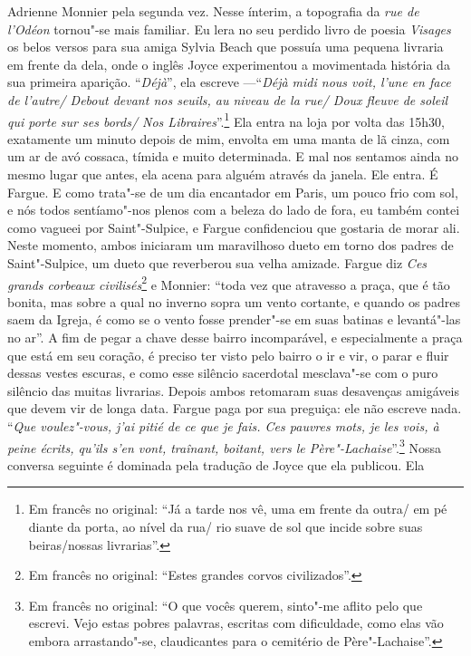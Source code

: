 Adrienne Monnier pela segunda vez. Nesse ínterim,
a topografia da \emph{rue de l'Odéon} tornou"-se mais familiar. Eu lera
no seu perdido livro de poesia \emph{Visages} os belos versos para sua
amiga Sylvia Beach que possuía uma pequena livraria em frente da dela,
onde o inglês Joyce experimentou a movimentada história da sua primeira
aparição. ``\emph{Déjà}'', ela escreve ---``\emph{Déjà midi nous voit,
l'une en face de l'autre/ Debout devant nos seuils, au niveau de la rue/ Doux fleuve de soleil qui porte sur ses bords/ Nos
Libraires}''.\footnote{Em francês no original: ``Já a tarde nos vê, uma em frente da outra/
  em pé diante da porta, ao nível da rua/ rio suave de sol que incide
  sobre suas beiras/nossas livrarias''. \versal{[N.~T.]}} Ela
entra na loja por volta das 15h30, exatamente um minuto depois de mim,
envolta em uma manta de lã cinza, com um ar de avó cossaca, tímida e
muito determinada. E mal nos sentamos ainda no mesmo lugar que antes,
ela acena para alguém através da janela. Ele entra. É Fargue. E como
trata"-se de um dia encantador em Paris, um pouco frio com sol, e nós
todos sentíamo"-nos plenos com a beleza do lado de fora, eu também
contei como vagueei por Saint"-Sulpice, e Fargue confidenciou que
gostaria de morar ali. Neste momento, ambos iniciaram um maravilhoso
dueto em torno dos padres de Saint"-Sulpice, um dueto que reverberou sua
velha amizade. Fargue diz \emph{Ces grands corbeaux civilisés}\footnote{Em francês no original:
  ``Estes grandes corvos civilizados''. \versal{[N.~T.]}} e
Monnier: ``toda vez que atravesso a praça, que é tão bonita, mas sobre a qual no inverno sopra um vento cortante, e quando os padres saem da Igreja, é como se o vento fosse prender"-se em suas batinas e levantá"-las no ar''.
A fim de pegar a chave desse bairro incomparável, e especialmente a praça que está em seu coração, é preciso ter visto pelo bairro o ir e vir, o parar e fluir dessas vestes escuras, e como esse silêncio sacerdotal mesclava"-se com o puro silêncio das muitas livrarias. Depois ambos retomaram suas desavenças amigáveis que
devem vir de longa data. Fargue paga por sua preguiça: ele não escreve
nada. ``\emph{Que voulez"-vous, j'ai pitié de ce que je fais. Ces pauvres
mots, je les vois, à peine écrits, qu'ils s'en vont, traînant, boitant,
vers le Père"-Lachaise}''.\footnote{Em francês no original: ``O que vocês querem, sinto"-me
  aflito pelo que escrevi. Vejo estas pobres palavras, escritas com
  dificuldade, como elas vão embora arrastando"-se, claudicantes para o
  cemitério de Père"-Lachaise''. \versal{[N.~T.]}} Nossa conversa
seguinte é dominada pela tradução de Joyce que ela publicou. Ela
